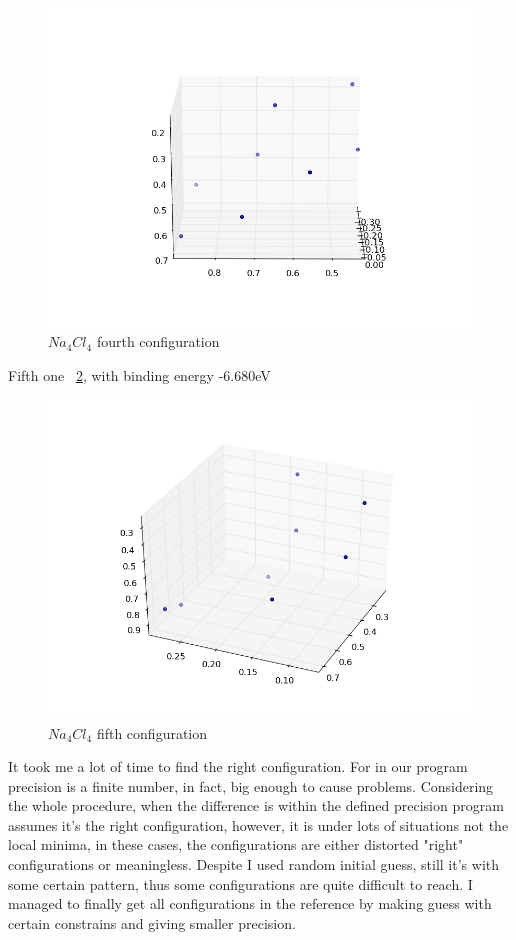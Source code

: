\documentclass[11pt,letterpaper]{article}
\begin{document}
\begin{figure}
\begin{center}
\includegraphics[width=0.8\linewidth,angle=0]{na4_4.png}
\caption{$Na_4Cl_4$ fourth configuration}
\label{figure7}
\end{center}
\end{figure}

Fifth one ~\ref{figure8}, with binding energy -6.680eV

\begin{figure}
\begin{center}
\includegraphics[width=0.8\linewidth,angle=0]{na4_5.png}
\caption{$Na_4Cl_4$ fifth configuration}
\label{figure8}
\end{center}
\end{figure}

It took me a lot of time to find the right configuration. For in our program precision is a finite number, in fact, big enough to cause problems. Considering the whole procedure, when the difference is within the defined precision program assumes it's the right configuration, however, it is under lots of situations not the local minima, in these cases, the configurations are either distorted "right" configurations or meaningless. Despite I used random initial guess, still it's with some certain pattern, thus some configurations are quite difficult to reach. I managed to finally get all configurations in the reference by making guess with certain constrains and giving smaller precision.
\end{document}
